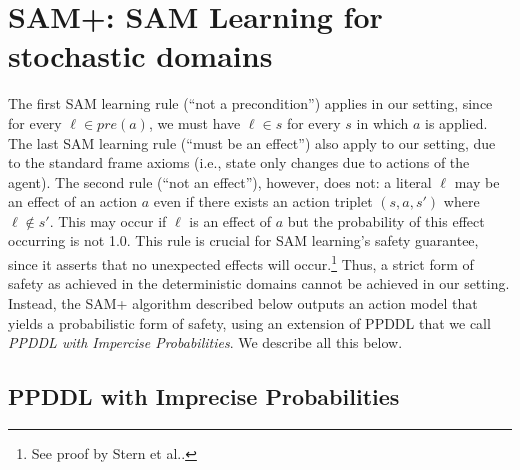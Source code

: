 \documentclass[letterpaper]{article} %
\newcommand{\pre}{\textit{pre}}
\newcommand{\tuple}[1]{\ensuremath{\left \langle #1 \right \rangle }}
\begin{document}
\section{SAM+: SAM Learning for stochastic domains}



The first SAM learning rule (``not a precondition'') applies in our setting, since for every $\ell\in\pre(a)$, we must have $\ell\in s$ for every $s$ in which $a$ is applied. 
The last SAM learning rule (``must be an effect'') also apply to our setting, due to the standard frame axioms (i.e., state only changes due to actions of the agent). 
The second rule (``not an effect''), however, does not: a literal $\ell$ may be an effect of an action $a$ even if there exists an action triplet $(s,a,s')$ where $\ell\notin s'$. 
This may occur if $\ell$ is an effect of $a$ but the probability of this effect occurring is not 1.0. 
This rule is crucial for SAM learning's safety guarantee, since it asserts that no unexpected effects will occur.\footnote{See proof by Stern et al..} 
Thus, a strict form of safety as achieved in the deterministic domains cannot be achieved in our setting. 
Instead, the SAM+ algorithm described below outputs an action model that
yields a probabilistic form of safety, using an extension of PPDDL that we call \emph{PPDDL with Impercise Probabilities}. 
We describe all this below. 



\subsection{PPDDL with Imprecise Probabilities}
\end{document}
